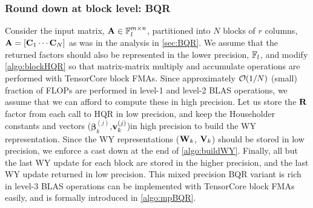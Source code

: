 \subsubsection{Round down at block level: BQR}\label{sec:mp-3b}
Consider the input matrix, $\mathbf{A}\in\mathbb{F}_l^{m\times n}$, partitioned into $N$ blocks of $r$ columns, $\mathbf{A}=[\mathbf{C}_1 \cdots \mathbf{C}_N]$ as was in the analysis in \cref{sec:BQR}.
We assume that the returned factors should also be represented in the lower precision, $\mathbb{F}_l$, and modify \cref{algo:blockHQR} so that matrix-matrix multiply and accumulate operations are performed with TensorCore block FMAs.
Since approximately $\mathcal{O}(1/N)$ (small) fraction of FLOPs are performed in level-1 and level-2 BLAS operations, we assume that we can afford to compute these in high precision.
Let us store the $\mathbf{R}$ factor from each call to HQR in low precision, and keep the Householder constants and vectors ($\bm{\beta}_k^{(j)}$,$\mathbf{v}_k^{(j)}$)in high precision to build the WY representation.
Since the WY representations ($\mathbf{W}_k$, $\mathbf{V}_k$) should be stored in low precision, we enforce a cast down at the end of \cref{algo:buildWY}.
Finally, all but the last WY update for each block are stored in the higher precision, and the last WY update returned in low precision. 
This mixed precision BQR variant is rich in level-3 BLAS operations can be implemented with TensorCore block FMAs easily, and is formally introduced in \cref{algo:mpBQR}.
